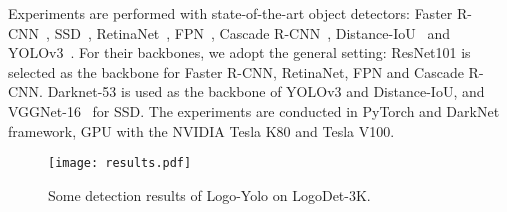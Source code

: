 \documentclass[journal]{IEEEtran}
\begin{document}
Experiments are performed with state-of-the-art object detectors: Faster R-CNN~\cite{Ren2015}, SSD~\cite{liu2016ssd}, RetinaNet~\cite{Tsung2017Focal}, FPN~\cite{Lin2017FPN}, Cascade R-CNN~\cite{Cai2018CascadeR-CNN}, Distance-IoU~\cite{Zheng2020Distance} and YOLOv3~\cite{Joseph2018Yolov3}. For their backbones, we adopt the general setting: ResNet101 is selected as the backbone for Faster R-CNN, RetinaNet, FPN and Cascade R-CNN. Darknet-53 is used as the backbone of YOLOv3 and Distance-IoU, and VGGNet-16~\cite{VGG2015} for SSD. The experiments are conducted in PyTorch and DarkNet framework, GPU with the NVIDIA Tesla K80 and Tesla V100.
\begin{figure*}[!t]
	\centering
	\texttt{[image: results.pdf]}
	\caption{Some detection results of Logo-Yolo on LogoDet-3K.}
	\label{result}
\end{figure*}
\end{document}
